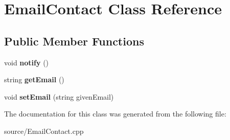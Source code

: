 \hypertarget{classEmailContact}{}\section{Email\+Contact Class Reference}
\label{classEmailContact}
\subsection*{Public Member Functions}
\begin{DoxyCompactItemize}
\item 
\mbox{\label{classEmailContact_a4917f5d74f8b134489538c7989432baf}} 
void {\bfseries notify} ()
\item 
\mbox{\label{classEmailContact_a294876fcc591e9e69710f6fbb73ac2de}} 
string {\bfseries get\+Email} ()
\item 
\mbox{\label{classEmailContact_a4ac8012fb4b28d290498e439b4663d3d}} 
void {\bfseries set\+Email} (string given\+Email)
\end{DoxyCompactItemize}


The documentation for this class was generated from the following file\+:\begin{DoxyCompactItemize}
\item 
source/Email\+Contact.\+cpp\end{DoxyCompactItemize}
